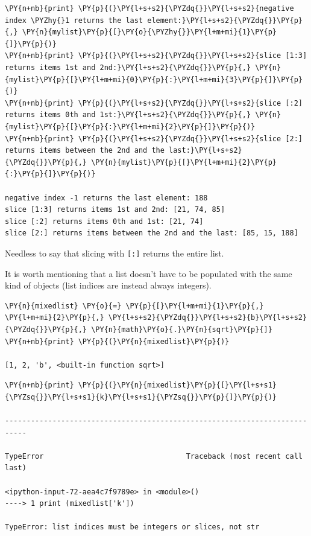 \begin{codebox}
\begin{Verbatim}[commandchars=\\\{\}]
\PY{n+nb}{print} \PY{p}{(}\PY{l+s+s2}{\PYZdq{}}\PY{l+s+s2}{negative index \PYZhy{}1 returns the last element:}\PY{l+s+s2}{\PYZdq{}}\PY{p}{,} \PY{n}{mylist}\PY{p}{[}\PY{o}{\PYZhy{}}\PY{l+m+mi}{1}\PY{p}{]}\PY{p}{)}
\PY{n+nb}{print} \PY{p}{(}\PY{l+s+s2}{\PYZdq{}}\PY{l+s+s2}{slice [1:3] returns items 1st and 2nd:}\PY{l+s+s2}{\PYZdq{}}\PY{p}{,} \PY{n}{mylist}\PY{p}{[}\PY{l+m+mi}{0}\PY{p}{:}\PY{l+m+mi}{3}\PY{p}{]}\PY{p}{)}
\PY{n+nb}{print} \PY{p}{(}\PY{l+s+s2}{\PYZdq{}}\PY{l+s+s2}{slice [:2] returns items 0th and 1st:}\PY{l+s+s2}{\PYZdq{}}\PY{p}{,} \PY{n}{mylist}\PY{p}{[}\PY{p}{:}\PY{l+m+mi}{2}\PY{p}{]}\PY{p}{)}
\PY{n+nb}{print} \PY{p}{(}\PY{l+s+s2}{\PYZdq{}}\PY{l+s+s2}{slice [2:] returns items between the 2nd and the last:}\PY{l+s+s2}{\PYZdq{}}\PY{p}{,} \PY{n}{mylist}\PY{p}{[}\PY{l+m+mi}{2}\PY{p}{:}\PY{p}{]}\PY{p}{)}

negative index -1 returns the last element: 188
slice [1:3] returns items 1st and 2nd: [21, 74, 85]
slice [:2] returns items 0th and 1st: [21, 74]
slice [2:] returns items between the 2nd and the last: [85, 15, 188]
\end{Verbatim}
\end{codebox}
\noindent
Needless to say that slicing with \texttt{[:]} returns the entire list.

It is worth mentioning that a list doesn't have to be populated
with the same kind of objects (list indices are instead always
integers).

\begin{codebox}
\begin{Verbatim}[commandchars=\\\{\}]
\PY{n}{mixedlist} \PY{o}{=} \PY{p}{[}\PY{l+m+mi}{1}\PY{p}{,} \PY{l+m+mi}{2}\PY{p}{,} \PY{l+s+s2}{\PYZdq{}}\PY{l+s+s2}{b}\PY{l+s+s2}{\PYZdq{}}\PY{p}{,} \PY{n}{math}\PY{o}{.}\PY{n}{sqrt}\PY{p}{]}
\PY{n+nb}{print} \PY{p}{(}\PY{n}{mixedlist}\PY{p}{)}

[1, 2, 'b', <built-in function sqrt>]
\end{Verbatim}
\end{codebox}

\begin{codebox}
\begin{Verbatim}[commandchars=\\\{\}]
\PY{n+nb}{print} \PY{p}{(}\PY{n}{mixedlist}\PY{p}{[}\PY{l+s+s1}{\PYZsq{}}\PY{l+s+s1}{k}\PY{l+s+s1}{\PYZsq{}}\PY{p}{]}\PY{p}{)}

---------------------------------------------------------------------------

TypeError                                 Traceback (most recent call last)

<ipython-input-72-aea4c7f9789e> in <module>()
----> 1 print (mixedlist['k'])
    
TypeError: list indices must be integers or slices, not str
\end{Verbatim}
\end{codebox}

